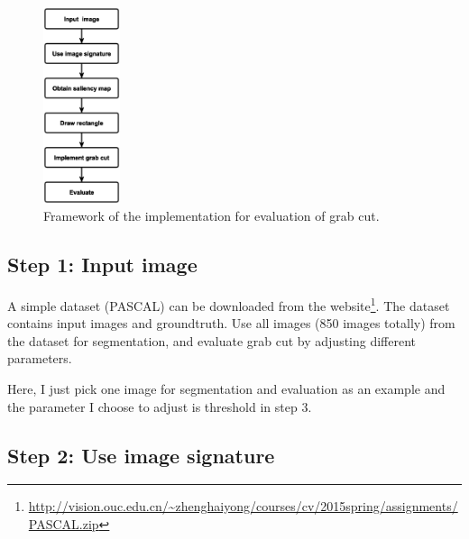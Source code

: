 \documentclass[12pt]{article}
\begin{document}
\begin{figure}[!ht]
\centering
\includegraphics[width=0.2\textwidth]{SIG_GRAB.eps}
\caption{Framework of the implementation for evaluation of grab cut.}
\label{fig: framework}
\end{figure}

\subsection{Step 1: Input image}

A simple dataset (PASCAL) can be downloaded from the website\footnote{\url{http://vision.ouc.edu.cn/~zhenghaiyong/courses/cv/2015spring/assignments/PASCAL.zip}}. The dataset contains input images and groundtruth. Use all images (850 images totally) from the dataset for segmentation, and evaluate grab cut by adjusting different parameters. 

Here, I just pick one image for segmentation and evaluation as an example and the parameter I choose to adjust is {\color{blue} threshold} in step 3.

\subsection{Step 2: Use image signature}
\end{document}
